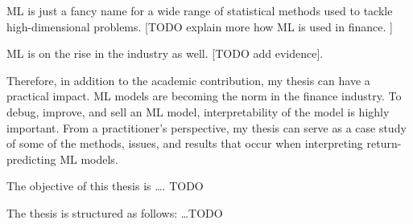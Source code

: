 ML is just a fancy name for a wide range of statistical methods used to tackle high-dimensional problems.  [TODO explain more how ML is used in finance.  ]

ML is on the rise in the industry as well. [TODO add evidence]. 

Therefore, in addition to the academic contribution, my thesis can have a practical impact. ML models are becoming the norm in the finance industry. To debug, improve, and sell an ML model, interpretability of the model is highly important. From a practitioner’s perspective, my thesis can serve as a case study of some of the methods, issues, and results that occur when interpreting return-predicting ML models.

The objective of this thesis is \ldots. TODO

The thesis is structured as follows: \ldots TODO 
